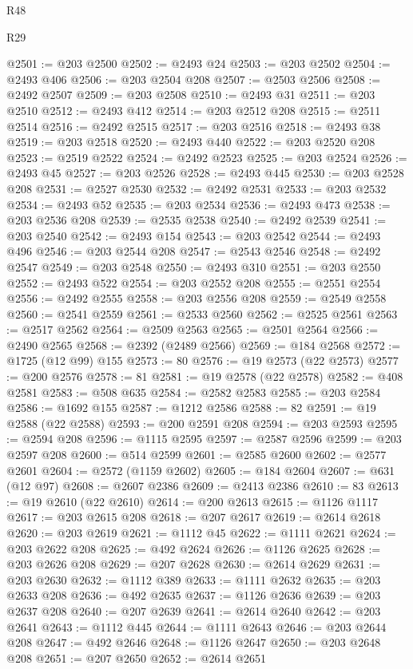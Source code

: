 \begin{lexlean}{R48}
\begin{lexlean}{R29}
\begin{coremodule}
{{{{{{{{{{{{{{{{{{{{{{{{{{{{{{{{{{{{{{{{{{{{{{{{{{{{{{{{{{{{{{{{{{{{{{{{{{{{{{{{{{{{{{{{{{{{{{{{{{{{{{{{{{{{{{{{{{{{{{{{{{{{{{{{{{{{{{{{{{{{{{{{{{{{{{{{{{{{{{{{{{{{{{{{{{{{{{{{{{{{{{{{{{{{{{{{{{{{{{{{{{{{{{{{{{{{{{{{{{@2501 := @203 @2500
@2502 := @2493 @24
@2503 := @203 @2502
@2504 := @2493 @406
@2506 := @203 @2504 @208
@2507 := @2503 @2506
@2508 := @2492 @2507
@2509 := @203 @2508
@2510 := @2493 @31
@2511 := @203 @2510
@2512 := @2493 @412
@2514 := @203 @2512 @208
@2515 := @2511 @2514
@2516 := @2492 @2515
@2517 := @203 @2516
@2518 := @2493 @38
@2519 := @203 @2518
@2520 := @2493 @440
@2522 := @203 @2520 @208
@2523 := @2519 @2522
@2524 := @2492 @2523
@2525 := @203 @2524
@2526 := @2493 @45
@2527 := @203 @2526
@2528 := @2493 @445
@2530 := @203 @2528 @208
@2531 := @2527 @2530
@2532 := @2492 @2531
@2533 := @203 @2532
@2534 := @2493 @52
@2535 := @203 @2534
@2536 := @2493 @473
@2538 := @203 @2536 @208
@2539 := @2535 @2538
@2540 := @2492 @2539
@2541 := @203 @2540
@2542 := @2493 @154
@2543 := @203 @2542
@2544 := @2493 @496
@2546 := @203 @2544 @208
@2547 := @2543 @2546
@2548 := @2492 @2547
@2549 := @203 @2548
@2550 := @2493 @310
@2551 := @203 @2550
@2552 := @2493 @522
@2554 := @203 @2552 @208
@2555 := @2551 @2554
@2556 := @2492 @2555
@2558 := @203 @2556 @208
@2559 := @2549 @2558
@2560 := @2541 @2559
@2561 := @2533 @2560
@2562 := @2525 @2561
@2563 := @2517 @2562
@2564 := @2509 @2563
@2565 := @2501 @2564
@2566 := @2490 @2565
@2568 := @2392 (@2489 @2566)
@2569 := @184 @2568
@2572 := @1725 (@12 @99) @155
@2573 := 80
@2576 := @19 @2573 (@22 @2573)
@2577 := @200 @2576
@2578 := 81
@2581 := @19 @2578 (@22 @2578)
@2582 := @408 @2581
@2583 := @508 @635
@2584 := @2582 @2583
@2585 := @203 @2584
@2586 := @1692 @155
@2587 := @1212 @2586
@2588 := 82
@2591 := @19 @2588 (@22 @2588)
@2593 := @200 @2591 @208
@2594 := @203 @2593
@2595 := @2594 @208
@2596 := @1115 @2595
@2597 := @2587 @2596
@2599 := @203 @2597 @208
@2600 := @514 @2599
@2601 := @2585 @2600
@2602 := @2577 @2601
@2604 := @2572 (@1159 @2602)
@2605 := @184 @2604
@2607 := @631 (@12 @97)
@2608 := @2607 @2386
@2609 := @2413 @2386
@2610 := 83
@2613 := @19 @2610 (@22 @2610)
@2614 := @200 @2613
@2615 := @1126 @1117
@2617 := @203 @2615 @208
@2618 := @207 @2617
@2619 := @2614 @2618
@2620 := @203 @2619
@2621 := @1112 @45
@2622 := @1111 @2621
@2624 := @203 @2622 @208
@2625 := @492 @2624
@2626 := @1126 @2625
@2628 := @203 @2626 @208
@2629 := @207 @2628
@2630 := @2614 @2629
@2631 := @203 @2630
@2632 := @1112 @389
@2633 := @1111 @2632
@2635 := @203 @2633 @208
@2636 := @492 @2635
@2637 := @1126 @2636
@2639 := @203 @2637 @208
@2640 := @207 @2639
@2641 := @2614 @2640
@2642 := @203 @2641
@2643 := @1112 @445
@2644 := @1111 @2643
@2646 := @203 @2644 @208
@2647 := @492 @2646
@2648 := @1126 @2647
@2650 := @203 @2648 @208
@2651 := @207 @2650
@2652 := @2614 @2651
}}}}}}}}}}}}}}}}}}}}}}}}}}}}}}}}}}}}}}}}}}}}}}}}}}}}}}}}}}}}}}}}}}}}}}}}}}}}}}}}}}}}}}}}}}}}}}}}}}}}}}}}}}}}}}}}}}}}}}}}}}}}}}}}}}}}}}}}}}}}}}}}}}}}}}}}}}}}}}}}}}}}}}}}}}}}}}}}}}}}}}}}}}}}}}}}}}}}}}}}}}}}}}}}}}}}}}}}}}
\end{coremodule}
\end{lexlean}
\end{lexlean}
